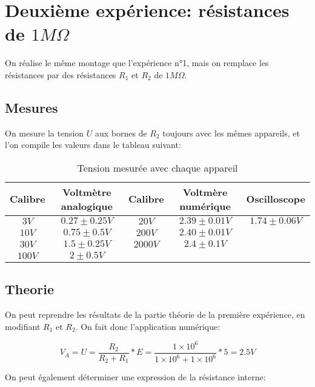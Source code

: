 \documentclass[10pt]{article}
\begin{document}
\section{Deuxième expérience: résistances de $1M \Omega$}
On réalise le même montage que l'expérience n°1, mais on remplace les résistances par des résistances $R_1$ et $R_2$ de $1M\Omega$.

\subsection{Mesures}
On mesure la tension $U$ aux bornes de $R_2$ toujours avec les mêmes appareils, et l'on compile les valeurs dans le tableau suivant:

\begin{table}[h!]
    \begin{center}
        \begin{tabular}{|c|c||c|c||c|}
            \hline
            Calibre & Voltmètre analogique & Calibre & Voltmère numérique & Oscilloscope \\
            \hline
            $3V$ & $0.27 \pm 0.25V$ & $20V$ & $2.39 \pm 0.01V$ & $1.74 \pm 0.06V$ \\
            $10V$ & $0.75 \pm 0.5V$ & $200V$ & $2.40 \pm 0.01V$ &  \\
            $30V$ & $1.5 \pm 0.25V$ & $2000V$ & $2.4 \pm 0.1V$ &  \\
            $100V$ & $2 \pm 0.5V$ & & & \\
            \hline
        \end{tabular}
        \caption{Tension mesurée avec chaque appareil}
        \label{table:table2}
    \end{center}
    \subsection{Theorie}
    On peut reprendre les résultats de la partie théorie de la première expérience, en modifiant $R_1$ et $R_2$. On fait donc 
    l'application numérique:

    \begin{equation}
        V_A = U = \frac{R_2}{R_2 + R_1} * E = \frac{1 \times 10^6}{1 \times 10^6 + 1 \times 10^6} * 5 = 2.5V
    \end{equation}

    On peut également déterminer une expression de la résistance interne:
    

\end{table}
\end{document}
